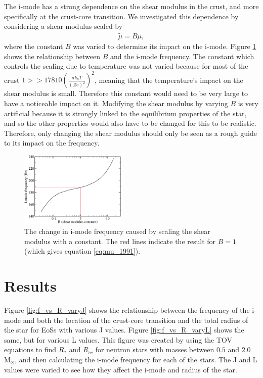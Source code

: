 \documentclass[fleqn,usenatbib]{mnras}
\begin{document}
\hspace{\parindent}The i-mode has a strong dependence on the shear modulus in the crust, and more specifically at the crust-core transition. We investigated this dependence by considering a shear modulus scaled by 
\begin{align}
\tilde{\mu} = B \mu,
\end{align}
\noindent where the constant $B$ was varied to determine its impact on the i-mode. Figure \ref{fig:mu_B} shows the relationship between $B$ and the i-mode frequency. The constant which controls the scaling due to temperature was not varied because for most of the crust $1>>17810\left(\frac{ak_bT}{\left(Ze\right)^2}\right)^2$, meaning that the temperature's impact on the shear modulus is small. Therefore this constant would need to be very large to have a noticeable impact on it. Modifying the shear modulus by varying $B$ is very artificial because it is strongly linked to the equilibrium properties of the star, and so the other properties would also have to be changed for this to be realistic. Therefore, only changing the shear modulus should only be seen as a rough guide to its impact on the frequency.

\begin{figure}
\centering
\includegraphics[width=0.45\textwidth,angle=0]{shear_mod_vs_freq_2}
\caption{The change in i-mode frequency caused by scaling the shear modulus with a constant. The red lines indicate the result for $B=1$ (which gives equation \ref{eq:mu_1991}).}
\label{fig:mu_B}
\end{figure}










\section{Results}
\hspace{\parindent}Figure \ref{fig:f_vs_R_varyJ} shows the relationship between the frequency of the i-mode and both the location of the crust-core transition and the total radius of the star for EoSs with various J values. Figure \ref{fig:f_vs_R_varyL} shows the same, but for various L values. This figure was created by using the TOV equations to find $R_*$ and $R_{cc}$ for neutron stars with masses between $0.5$ and $2.0$ M$_{\odot}$, and then calculating the i-mode frequency for each of the stars. The J and L values were varied to see how they affect the i-mode and radius of the star.
\end{document}
